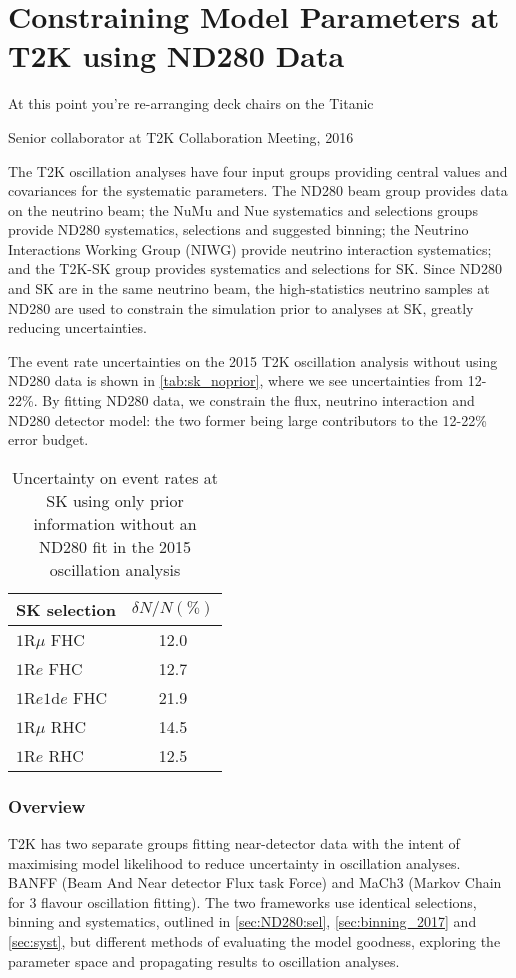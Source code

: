 \chapter{Constraining Model Parameters at T2K using ND280 Data}
\label{chap:ND280}

\epigraph{At this point you're re-arranging deck chairs on the Titanic}{Senior collaborator at T2K Collaboration Meeting, 2016}

The T2K oscillation analyses have four input groups providing central values and covariances for the systematic parameters. The ND280 beam group provides data on the neutrino beam; the NuMu and Nue systematics and selections groups provide ND280 systematics, selections and suggested binning; the Neutrino Interactions Working Group (NIWG) provide neutrino interaction systematics; and the T2K-SK group provides systematics and selections for SK. Since ND280 and SK are in the same neutrino beam, the high-statistics neutrino samples at ND280 are used to constrain the simulation prior to analyses at SK, greatly reducing uncertainties. 

The event rate uncertainties on the 2015 T2K oscillation analysis without using ND280 data is shown in \autoref{tab:sk_noprior}, where we see uncertainties from 12-22\%. By fitting ND280 data, we constrain the flux, neutrino interaction and ND280 detector model: the two former being large contributors to the 12-22\% error budget.
\begin{table}[h]
	\begin{tabular}{l | c}
		\hline
		\hline
		SK selection & $\delta N/N (\%)$ \\
		\hline
		$1\text{R}\mu$ FHC & 12.0 \\
		$1\text{R}e$ FHC & 12.7 \\
		$1\text{R}e1\text{d}e$ FHC & 21.9 \\
		\hline
		$1\text{R}\mu$ RHC & 14.5 \\
		$1\text{R}e$ RHC & 12.5 \\
		\hline
		\hline
	\end{tabular}
	\caption{Uncertainty on event rates at SK using only prior information without an ND280 fit in the 2015 oscillation analysis\cite{t2k_2015}}
	\label{tab:sk_noprior}
\end{table}

\subsection{Overview}
T2K has two separate groups fitting near-detector data with the intent of maximising model likelihood to reduce uncertainty in oscillation analyses. BANFF (Beam And Near detector Flux task Force) and MaCh3 (Markov Chain for 3 flavour oscillation fitting). The two frameworks use identical selections, binning and systematics, outlined in \autoref{sec:ND280:sel}, \autoref{sec:binning_2017} and \autoref{sec:syst}, but different methods of evaluating the model goodness, exploring the parameter space and propagating results to oscillation analyses.

